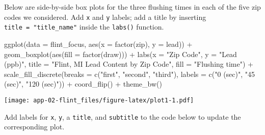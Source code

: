 \documentclass[
]{article}
\newenvironment{Shaded}{\begin{snugshade}}{\end{snugshade}}
\newcommand{\AttributeTok}[1]{\textcolor[rgb]{0.77,0.63,0.00}{#1}}
\newcommand{\FunctionTok}[1]{\textcolor[rgb]{0.00,0.00,0.00}{#1}}
\newcommand{\NormalTok}[1]{#1}
\newcommand{\SpecialCharTok}[1]{\textcolor[rgb]{0.00,0.00,0.00}{#1}}
\newcommand{\StringTok}[1]{\textcolor[rgb]{0.31,0.60,0.02}{#1}}
\begin{document}
Below are side-by-side box plots for the three flushing times in each of
the five zip codes we considered. Add \texttt{x} and \texttt{y} labels;
add a title by inserting \texttt{title\ =\ "title\_name"} inside the
\texttt{labs()} function.

\begin{Shaded}
\begin{Highlighting}[]
\FunctionTok{ggplot}\NormalTok{(}\AttributeTok{data =}\NormalTok{ flint\_focus, }\FunctionTok{aes}\NormalTok{(}\AttributeTok{x =} \FunctionTok{factor}\NormalTok{(zip), }\AttributeTok{y =}\NormalTok{ lead)) }\SpecialCharTok{+}
  \FunctionTok{geom\_boxplot}\NormalTok{(}\FunctionTok{aes}\NormalTok{(}\AttributeTok{fill =} \FunctionTok{factor}\NormalTok{(draw))) }\SpecialCharTok{+}
  \FunctionTok{labs}\NormalTok{(}\AttributeTok{x =} \StringTok{"Zip Code"}\NormalTok{, }\AttributeTok{y =} \StringTok{"Lead (ppb)"}\NormalTok{, }\AttributeTok{title =} \StringTok{"Flint, MI Lead Content by Zip Code"}\NormalTok{, }\AttributeTok{fill =} \StringTok{"Flushing time"}\NormalTok{) }\SpecialCharTok{+}
  \FunctionTok{scale\_fill\_discrete}\NormalTok{(}\AttributeTok{breaks =} \FunctionTok{c}\NormalTok{(}\StringTok{"first"}\NormalTok{, }\StringTok{"second"}\NormalTok{, }\StringTok{"third"}\NormalTok{),}
                      \AttributeTok{labels =} \FunctionTok{c}\NormalTok{(}\StringTok{"0 (sec)"}\NormalTok{, }\StringTok{"45 (sec)"}\NormalTok{, }\StringTok{"120 (sec)"}\NormalTok{)) }\SpecialCharTok{+}
  \FunctionTok{coord\_flip}\NormalTok{() }\SpecialCharTok{+}
  \FunctionTok{theme\_bw}\NormalTok{()}
\end{Highlighting}
\end{Shaded}

\texttt{[image: app-02-flint\_files/figure-latex/plot1-1.pdf]}

Add labels for \texttt{x}, \texttt{y}, a \texttt{title}, and
\texttt{subtitle} to the code below to update the corresponding plot.
\end{document}
